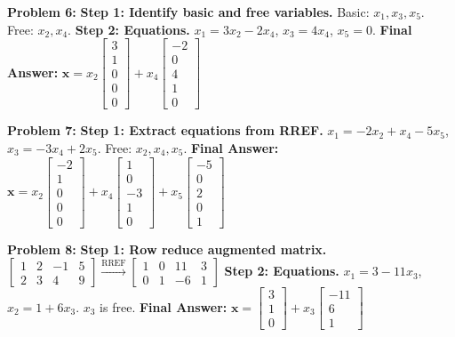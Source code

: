 \documentclass[12pt]{article}
\begin{document}
\textbf{Problem 6:}
\textbf{Step 1: Identify basic and free variables.}
Basic: $x_1, x_3, x_5$. Free: $x_2, x_4$.
\textbf{Step 2: Equations.}
$x_1 = 3x_2 - 2x_4$, $x_3 = 4x_4$, $x_5 = 0$.
\textbf{Final Answer:} $\mathbf{x} = x_2 \begin{bmatrix} 3 \\ 1 \\ 0 \\ 0 \\ 0 \end{bmatrix} + x_4 \begin{bmatrix} -2 \\ 0 \\ 4 \\ 1 \\ 0 \end{bmatrix}$

\textbf{Problem 7:}
\textbf{Step 1: Extract equations from RREF.}
$x_1 = -2x_2 + x_4 - 5x_5$, $x_3 = -3x_4 + 2x_5$. Free: $x_2, x_4, x_5$.
\textbf{Final Answer:} $\mathbf{x} = x_2 \begin{bmatrix} -2 \\ 1 \\ 0 \\ 0 \\ 0 \end{bmatrix} + x_4 \begin{bmatrix} 1 \\ 0 \\ -3 \\ 1 \\ 0 \end{bmatrix} + x_5 \begin{bmatrix} -5 \\ 0 \\ 2 \\ 0 \\ 1 \end{bmatrix}$

\textbf{Problem 8:}
\textbf{Step 1: Row reduce augmented matrix.}
$\begin{bmatrix} 1 & 2 & -1 & 5 \\ 2 & 3 & 4 & 9 \end{bmatrix} \xrightarrow{\text{RREF}} \begin{bmatrix} 1 & 0 & 11 & 3 \\ 0 & 1 & -6 & 1 \end{bmatrix}$
\textbf{Step 2: Equations.}
$x_1 = 3 - 11x_3$, $x_2 = 1 + 6x_3$. $x_3$ is free.
\textbf{Final Answer:} $\mathbf{x} = \begin{bmatrix} 3 \\ 1 \\ 0 \end{bmatrix} + x_3 \begin{bmatrix} -11 \\ 6 \\ 1 \end{bmatrix}$
\end{document}
